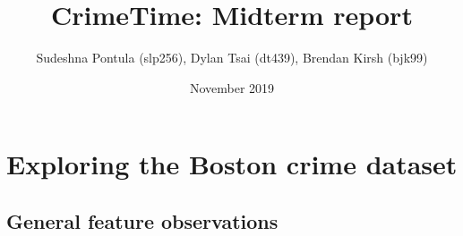 \documentclass{article}
\title{CrimeTime: Midterm report}
\author{Sudeshna Pontula (slp256), Dylan Tsai (dt439), Brendan Kirsh (bjk99) }
\date{November 2019}
\begin{document}
\maketitle

\section{Exploring the Boston crime dataset}
\subsection*{General feature observations}
\end{document}
